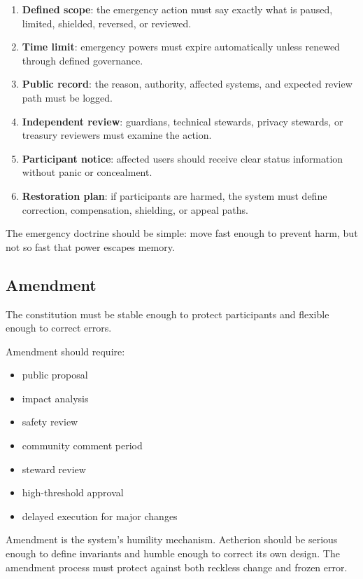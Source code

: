 \documentclass[12pt]{article}
\begin{document}
\begin{enumerate}
  \item \textbf{Defined scope}: the emergency action must say exactly what is paused, limited, shielded, reversed, or reviewed.
  \item \textbf{Time limit}: emergency powers must expire automatically unless renewed through defined governance.
  \item \textbf{Public record}: the reason, authority, affected systems, and expected review path must be logged.
  \item \textbf{Independent review}: guardians, technical stewards, privacy stewards, or treasury reviewers must examine the action.
  \item \textbf{Participant notice}: affected users should receive clear status information without panic or concealment.
  \item \textbf{Restoration plan}: if participants are harmed, the system must define correction, compensation, shielding, or appeal paths.
\end{enumerate}

The emergency doctrine should be simple: move fast enough to prevent harm, but not so fast that power escapes memory.

\subsection{Amendment}

The constitution must be stable enough to protect participants and flexible enough to correct errors.

Amendment should require:

\begin{itemize}
  \item public proposal
  \item impact analysis
  \item safety review
  \item community comment period
  \item steward review
  \item high-threshold approval
  \item delayed execution for major changes
\end{itemize}

Amendment is the system's humility mechanism. Aetherion should be serious enough to define invariants and humble enough to correct its own design. The amendment process must protect against both reckless change and frozen error.
\end{document}
